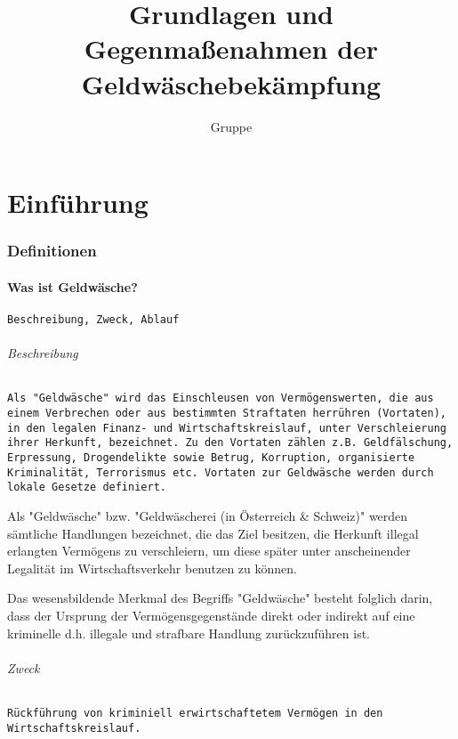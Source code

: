\documentclass{article}
\begin{document}
\title{Grundlagen und Gegenmaßenahmen der Geldwäschebekämpfung}
\author{Gruppe}
\maketitle

\tableofcontents

\newpage

\part[Einführung]{Einführung}
    \section[Defintionen]{Definitionen}
        \subsection[Was ist Geldwäsche?]{Was ist Geldwäsche?}
            \texttt{Beschreibung, Zweck, Ablauf}
            
            \paragraph[Beschreibung]{Beschreibung}
             	\texttt
                        {Als "Geldwäsche" wird das Einschleusen von Vermögenswerten, die aus einem Verbrechen oder aus bestimmten Straftaten herrühren (Vortaten), in den legalen Finanz- und Wirtschaftskreislauf, unter Verschleierung ihrer Herkunft, bezeichnet. Zu den Vortaten zählen z.B. Geldfälschung, Erpressung, Drogendelikte sowie Betrug, Korruption, organisierte Kriminalität, Terrorismus etc. Vortaten zur Geldwäsche werden durch lokale Gesetze definiert.}   

            		Als "Geldwäsche" bzw. "Geldwäscherei (in Österreich \& Schweiz)" werden sämtliche Handlungen bezeichnet, die das Ziel besitzen, die Herkunft illegal erlangten Vermögens zu verschleiern, um diese später unter anscheinender Legalität im Wirtschaftsverkehr benutzen zu können.

	               	Das wesensbildende Merkmal des Begriffs "Geldwäsche" besteht folglich darin, dass der Ursprung der Vermögensgegenstände direkt oder indirekt auf eine kriminelle d.h. illegale und strafbare Handlung zurückzuführen ist.
            
            \paragraph[Zweck]{Zweck}
            	\texttt
                        {Rückführung von kriminiell erwirtschaftetem Vermögen in den Wirtschaftskreislauf.}
\end{document}
